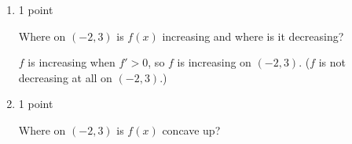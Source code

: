 \documentclass{article}
\begin{document}
\begin{enumerate}
\begin{enumerate}
    \begin{problem}[\vfill]
      Sketch the graph of $f''(x)$.
    \end{problem}

    \begin{solution}
      $f''$ is the derivative of $f'$, so we're sketching the derivative of the given graph: 
      \begin{center}
      \end{center}
      In particular, $f'$ is not differentiable at $\pm 1$, so $f''$ is undefined at those values.
    \end{solution}

  \item

    \begin{grading}
      1 point
    \end{grading}

    \begin{problem}[\stretch{0.4}]
      Where on $(-2, 3)$ is $f(x)$ increasing and where is it decreasing?
    \end{problem}

    \begin{solution}
      $f$ is increasing when $f' > 0$, so $f$ is increasing on $(-2,
      3)$.  ($f$ is not decreasing at all on $(-2, 3)$.)
    \end{solution}

  \item

    \begin{grading}
      1 point
    \end{grading}

    \begin{problem}[\nstretch{0.4}]
      Where on $(-2, 3)$ is $f(x)$ concave up? 
    \end{problem}


\end{enumerate}
\end{enumerate}
\end{document}
